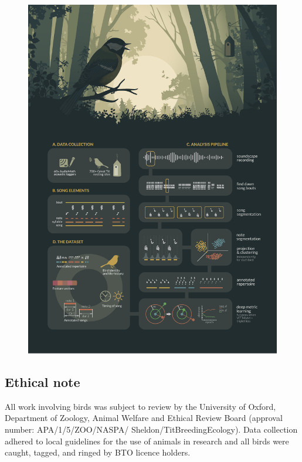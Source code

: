 \begin{figure}[htbp]
    \centering
    \includegraphics[width=\linewidth]{figures/chapter_3/FIG2-AB.pdf}
    \label{c3_fig:pipeline}
\end{figure}

\subsection{Ethical note}
All work involving birds was subject to review by the University of Oxford, Department of Zoology, Animal Welfare and Ethical Review Board (approval number: APA/1/5/ZOO/NASPA/ Sheldon/TitBreedingEcology). Data collection adhered to local guidelines for the use of animals in research and all birds were caught, tagged, and ringed by BTO licence holders.

